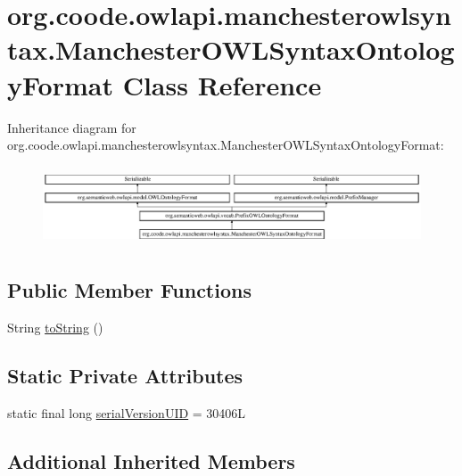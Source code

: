 \hypertarget{classorg_1_1coode_1_1owlapi_1_1manchesterowlsyntax_1_1_manchester_o_w_l_syntax_ontology_format}{\section{org.\-coode.\-owlapi.\-manchesterowlsyntax.\-Manchester\-O\-W\-L\-Syntax\-Ontology\-Format Class Reference}
\label{classorg_1_1coode_1_1owlapi_1_1manchesterowlsyntax_1_1_manchester_o_w_l_syntax_ontology_format}
}
Inheritance diagram for org.\-coode.\-owlapi.\-manchesterowlsyntax.\-Manchester\-O\-W\-L\-Syntax\-Ontology\-Format\-:\begin{figure}[H]
\begin{center}
\leavevmode
\includegraphics[height=2.388060cm]{classorg_1_1coode_1_1owlapi_1_1manchesterowlsyntax_1_1_manchester_o_w_l_syntax_ontology_format}
\end{center}
\end{figure}
\subsection*{Public Member Functions}
\begin{DoxyCompactItemize}
\item 
String \hyperlink{classorg_1_1coode_1_1owlapi_1_1manchesterowlsyntax_1_1_manchester_o_w_l_syntax_ontology_format_abd808e0a8d8569be48e5aafb2292c860}{to\-String} ()
\end{DoxyCompactItemize}
\subsection*{Static Private Attributes}
\begin{DoxyCompactItemize}
\item 
static final long \hyperlink{classorg_1_1coode_1_1owlapi_1_1manchesterowlsyntax_1_1_manchester_o_w_l_syntax_ontology_format_ae3b3c79d4fc36b8ad5264e7ecd7326a0}{serial\-Version\-U\-I\-D} = 30406\-L
\end{DoxyCompactItemize}
\subsection*{Additional Inherited Members}


